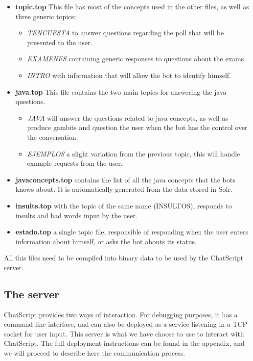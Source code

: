 \begin{itemize}
 \item \textbf{topic.top} This file has most of the concepts used in the other files, as well as three generic topics:
 \begin{itemize}
  \item \emph{TENCUESTA} to answer questions regarding the poll that will be presented to the user.
  \item \emph{EXAMENES} containing generic responses to questions about the exams.
  \item \emph{INTRO} with information that will allow the bot to identify himself.
 \end{itemize}
 \item \textbf{java.top} This file contains the two main topics for answering the java questions.
 \begin{itemize}
  \item \emph{JAVA} will answer the questions related to java concepts, as well as produce gambits and question the user when the bot has the control over the conversation.
  \item \emph{EJEMPLOS} a slight variation from the previous topic, this will handle example requests from the user.
 \end{itemize}
 \item \textbf{javaconcepts.top} contains the list of all the java concepts that the bots knows about. It is automatically generated from the data stored in Solr.
 \item \textbf{insults.top} with the topic of the same name (INSULTOS), responds to insults and bad words input by the user.
 \item \textbf{estado.top} a single topic file, responsible of responding when the user enters information about himself, or asks the bot abouts its status.
\end{itemize}

All this files need to be compiled into binary data to be used by the ChatScript server.

\subsection{The server}

ChatScript provides two ways of interaction. For debugging purposes, it has a command line interface, and can also be deployed as a service listening in a TCP socket for user input. This server is what we have choose to use to interact with ChatScript. The full deployment instructions can be found in the appendix, and we will proceed to describe here the communication process.


